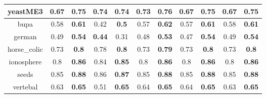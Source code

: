 \documentclass{article}%
\begin{document}
\begin{tabular}{c|cccccccccc}
\hline%
yeastME3&0.67&\textbf{0.75}&0.74&\textbf{0.74}&0.73&\textbf{0.76}&0.67&\textbf{0.75}&0.67&\textbf{0.75}\\%
\hline%
bupa&0.58&\textbf{0.61}&0.42&\textbf{0.5}&0.57&\textbf{0.62}&0.57&\textbf{0.61}&0.58&\textbf{0.61}\\%
\hline%
german&0.49&\textbf{0.54}&\textbf{0.44}&0.31&0.48&\textbf{0.53}&0.47&\textbf{0.54}&0.49&\textbf{0.54}\\%
\hline%
horse\_colic&0.73&\textbf{0.8}&0.78&\textbf{0.8}&0.73&\textbf{0.79}&0.73&\textbf{0.8}&0.73&\textbf{0.8}\\%
\hline%
ionosphere&0.8&\textbf{0.86}&0.84&\textbf{0.85}&0.8&\textbf{0.86}&0.8&\textbf{0.86}&0.8&\textbf{0.86}\\%
\hline%
seeds&0.85&\textbf{0.88}&0.86&\textbf{0.87}&0.85&\textbf{0.88}&0.85&\textbf{0.88}&0.85&\textbf{0.88}\\%
\hline%
vertebal&0.63&\textbf{0.65}&0.51&\textbf{0.65}&0.64&\textbf{0.65}&0.64&\textbf{0.65}&0.63&\textbf{0.65}\\%
\hline%
\end{tabular}

%
\end{document}
